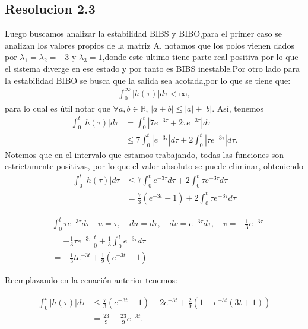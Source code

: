 \documentclass[
  11pt,
  letterpaper,
   addpoints,
   answers
  ]{exam}
\begin{document}
\begin{questions}
\begin{solution}
\subsection*{Resolucion 2.3}
Luego buscamos analizar la estabilidad BIBS y BIBO,para el primer caso se analizan los valores propios de la matriz A, notamos que los polos vienen dados por $\lambda_{1}=\lambda_{2}=-3$ y $\lambda_{3}=1$,donde este ultimo tiene parte real positiva por lo que el sistema diverge en ese estado y por tanto es BIBS inestable.Por otro lado para la estabilidad BIBO se busca que la salida sea acotada,por lo que se tiene que:
\begin{align}
    \int_0^\infty |h(\tau)| d\tau < \infty,
    \end{align}
    para lo cual es útil notar que $\forall a,b \in \mathbb{R}$, $|a + b| \leq |a| + |b|$. Así, tenemos
    \begin{align}
    \int_0^t |h(\tau)| d\tau &= \int_0^t |7e^{-3\tau} + 2\tau e^{-3\tau}| d\tau \\
    &\leq 7 \int_0^t |e^{-3\tau}| d\tau + 2 \int_0^t |\tau e^{-3\tau}| d\tau.
    \end{align}
    Notemos que en el intervalo que estamos trabajando, todas las funciones son estrictamente positivas, por lo que el valor absoluto se puede eliminar, obteniendo
    \begin{align}
    \int_0^t |h(\tau)| d\tau &\leq 7 \int_0^t e^{-3\tau} d\tau + 2 \int_0^t \tau e^{-3\tau} d\tau \\
    &=  \frac{7}{3} (e^{-3t} - 1) + 2 \int_0^t \tau e^{-3\tau} d\tau
    \end{align}
\end{solution}
\begin{align}
    &\int_0^t \tau e^{-3\tau} d\tau \quad u = \tau, \quad du = d\tau, \quad dv = e^{-3\tau} d\tau, \quad v = -\frac{1}{3} e^{-3\tau} \\
    &= -\frac{1}{3} \tau e^{-3\tau} \Big|_0^t + \frac{1}{3} \int_0^t e^{-3\tau} d\tau \\
      &= -\frac{1}{3} t e^{-3t} + \frac{1}{9} \left( e^{-3t} - 1 \right)
    \end{align}
    
    Reemplazando en la ecuación anterior tenemos:

    \begin{align}
    \int_0^t |h(\tau)| d\tau &\leq \frac{7}{3} \left( e^{-3t} - 1 \right) - 2 e^{-3t} + \frac{2}{9} \left( 1 - e^{-3t}(3t + 1) \right) \\
                             &= \frac{23}{9} - \frac{23}{9} e^{-3t}.
    \end{align}
    

\end{questions}
\end{document}
